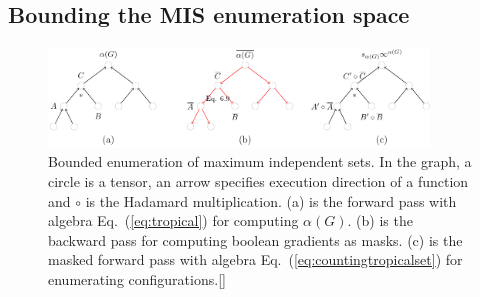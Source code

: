\documentclass[onefignum, onetabnum]{siamart190516}
\newcommand{\<}{\langle}
\renewcommand{\>}{\rangle}
\newcommand{\Eq}[1]{Eq.~(\ref{#1})}
\newcommand{\red}[1]{[{\bf  \color{red}{ST: #1}}]}
\begin{document}
\subsection{Bounding the MIS enumeration space}
\begin{figure}
    \centering
    \includegraphics[width=0.9\textwidth, trim={0cm 0cm 0cm 0cm}, clip]{figures/masktree.pdf}
    \caption{Bounded enumeration of maximum independent sets. In the graph, a circle is a tensor, an arrow specifies execution direction of a function and $\circ$ is the Hadamard multiplication. (a) is the forward pass with algebra \Eq{eq:tropical} for computing $\alpha(G)$.
     (b) is the backward pass for computing boolean gradients as masks.
     (c) is the masked forward pass with algebra \Eq{eq:countingtropicalset} for enumerating configurations.\red{line thicker}}
     \label{fig:bounding}
\end{figure}
\end{document}
